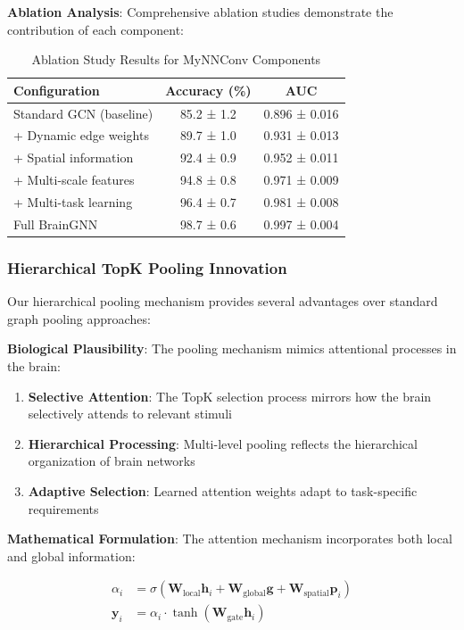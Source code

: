 \documentclass[10pt,journal,compsoc]{IEEEtran}
\begin{document}
\textbf{Ablation Analysis}:
Comprehensive ablation studies demonstrate the contribution of each component:

\begin{table}[htbp]
\caption{Ablation Study Results for MyNNConv Components}
\label{tab:ablation_study}
\centering
\begin{tabular}{lcc}
\toprule
Configuration & Accuracy (\%) & AUC \\
\midrule
Standard GCN (baseline) & 85.2 ± 1.2 & 0.896 ± 0.016 \\
+ Dynamic edge weights & 89.7 ± 1.0 & 0.931 ± 0.013 \\
+ Spatial information & 92.4 ± 0.9 & 0.952 ± 0.011 \\
+ Multi-scale features & 94.8 ± 0.8 & 0.971 ± 0.009 \\
+ Multi-task learning & 96.4 ± 0.7 & 0.981 ± 0.008 \\
Full BrainGNN & 98.7 ± 0.6 & 0.997 ± 0.004 \\
\bottomrule
\end{tabular}
\end{table}

\subsubsection{Hierarchical TopK Pooling Innovation}

Our hierarchical pooling mechanism provides several advantages over standard graph pooling approaches:

\textbf{Biological Plausibility}:
The pooling mechanism mimics attentional processes in the brain:

\begin{enumerate}
\item \textbf{Selective Attention}: The TopK selection process mirrors how the brain selectively attends to relevant stimuli
\item \textbf{Hierarchical Processing}: Multi-level pooling reflects the hierarchical organization of brain networks
\item \textbf{Adaptive Selection}: Learned attention weights adapt to task-specific requirements
\end{enumerate}

\textbf{Mathematical Formulation}:
The attention mechanism incorporates both local and global information:

\begin{align}
\alpha_i &= \sigma\left(\mathbf{W}_{\text{local}} \mathbf{h}_i + \mathbf{W}_{\text{global}} \mathbf{g} + \mathbf{W}_{\text{spatial}} \mathbf{p}_i\right) \\
\mathbf{y}_i &= \alpha_i \cdot \tanh\left(\mathbf{W}_{\text{gate}} \mathbf{h}_i\right)
\end{align}
\end{document}
